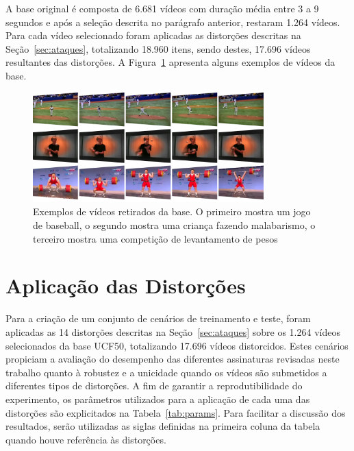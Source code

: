 A base original é composta de 6.681 vídeos com duração média entre 3 a 9 segundos e após a seleção descrita no parágrafo anterior, restaram 1.264 vídeos. Para cada vídeo selecionado foram aplicadas as distorções descritas na Seção~\ref{sec:ataques}, totalizando 18.960 itens, sendo destes, 17.696 vídeos resultantes das distorções. A Figura~\ref{fig:exemplos} apresenta alguns exemplos de vídeos da base.

\begin{figure}
    \centering
    \caption{Exemplos de vídeos retirados da base. O primeiro mostra um jogo de baseball, o segundo mostra uma criança fazendo malabarismo, o terceiro mostra uma competição de levantamento de pesos}
    \label{fig:exemplos}
    \includegraphics[width=0.8\textwidth]{dados/figuras/exemplos.png}
\end{figure}

\section{Aplicação das Distorções}
\label{sec:met-distorcoes}

Para a criação de um conjunto de cenários de treinamento e teste, foram aplicadas as 14 distorções descritas na Seção~\ref{sec:ataques} sobre os 1.264 vídeos selecionados da base UCF50, totalizando 17.696 vídeos distorcidos. Estes cenários propiciam a avaliação do desempenho das diferentes assinaturas revisadas neste trabalho quanto à robustez e a unicidade quando os vídeos são submetidos a diferentes tipos de distorções. A fim de garantir a reprodutibilidade do experimento, os parâmetros utilizados para a aplicação de cada uma das distorções são explicitados na Tabela~\ref{tab:params}. Para facilitar a discussão dos resultados, serão utilizadas as siglas definidas na primeira coluna da tabela quando houve referência às distorções.

